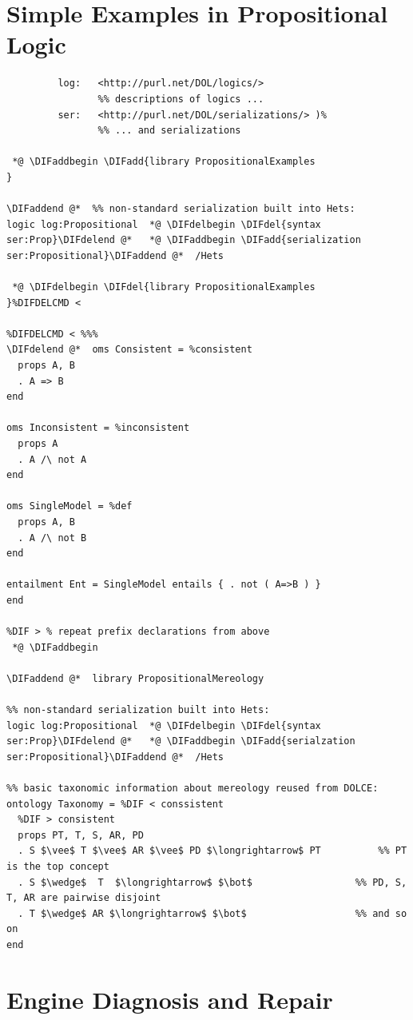 \documentclass[10pt,fleqn,final]{scrreprt}
\newcommand{\sclause}[1]{\section{#1}}
\providecommand{\DIFadd}[1]{{\protect\color{blue}\uwave{#1}}} %
\providecommand{\DIFdel}[1]{{\protect\color{red}\sout{#1}}}                      %
\providecommand{\DIFaddbegin}{} %
\providecommand{\DIFaddend}{} %
\providecommand{\DIFdelbegin}{} %
\providecommand{\DIFdelend}{} %
\begin{document}
\sclause{Simple Examples in Propositional Logic} 
\label{ex:prop}
\begin{lstlisting}[basicstyle=\ttfamily,language=dolText,alsolanguage=prop,escapechar=@,mathescape]
 %prefix( :      <http://www.example.org/prop#>
         log:   <http://purl.net/DOL/logics/>
                %% descriptions of logics ...
         ser:   <http://purl.net/DOL/serializations/> )%
                %% ... and serializations

 *@ \DIFaddbegin \DIFadd{library PropositionalExamples
}

\DIFaddend @*  %% non-standard serialization built into Hets: 
logic log:Propositional  *@ \DIFdelbegin \DIFdel{syntax ser:Prop}\DIFdelend @*   *@ \DIFaddbegin \DIFadd{serialization ser:Propositional}\DIFaddend @*  /Hets       

 *@ \DIFdelbegin \DIFdel{library PropositionalExamples
}%DIFDELCMD < 

%DIFDELCMD < %%%
\DIFdelend @*  oms Consistent = %consistent
  props A, B
  . A => B
end

oms Inconsistent = %inconsistent
  props A
  . A /\ not A
end

oms SingleModel = %def
  props A, B
  . A /\ not B
end

entailment Ent = SingleModel entails { . not ( A=>B ) }
end

%DIF > % repeat prefix declarations from above
 *@ \DIFaddbegin 

\DIFaddend @*  library PropositionalMereology

%% non-standard serialization built into Hets: 
logic log:Propositional  *@ \DIFdelbegin \DIFdel{syntax ser:Prop}\DIFdelend @*   *@ \DIFaddbegin \DIFadd{serialzation ser:Propositional}\DIFaddend @*  /Hets

%% basic taxonomic information about mereology reused from DOLCE:
ontology Taxonomy = %DIF < conssistent      
  %DIF > consistent
  props PT, T, S, AR, PD
  . S $\vee$ T $\vee$ AR $\vee$ PD $\longrightarrow$ PT          %% PT is the top concept
  . S $\wedge$  T  $\longrightarrow$ $\bot$                  %% PD, S, T, AR are pairwise disjoint
  . T $\wedge$ AR $\longrightarrow$ $\bot$                   %% and so on
end
\end{lstlisting}

\sclause{Engine Diagnosis and Repair}\DIFdelbegin %
\DIFdelend \DIFaddbegin \label{ex:engine}
\DIFaddend 
\end{document}

